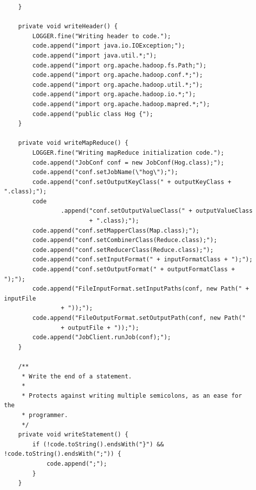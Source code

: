 \documentclass{report}
\begin{document}
\begin{verbatim}
	}

	private void writeHeader() {
		LOGGER.fine("Writing header to code.");
		code.append("import java.io.IOException;");
		code.append("import java.util.*;");
		code.append("import org.apache.hadoop.fs.Path;");
		code.append("import org.apache.hadoop.conf.*;");
		code.append("import org.apache.hadoop.util.*;");
		code.append("import org.apache.hadoop.io.*;");
		code.append("import org.apache.hadoop.mapred.*;");
		code.append("public class Hog {");
	}

	private void writeMapReduce() {
		LOGGER.fine("Writing mapReduce initialization code.");
		code.append("JobConf conf = new JobConf(Hog.class);");
		code.append("conf.setJobName(\"hog\");");
		code.append("conf.setOutputKeyClass(" + outputKeyClass + ".class);");
		code
				.append("conf.setOutputValueClass(" + outputValueClass
						+ ".class);");
		code.append("conf.setMapperClass(Map.class);");
		code.append("conf.setCombinerClass(Reduce.class);");
		code.append("conf.setReducerClass(Reduce.class);");
		code.append("conf.setInputFormat(" + inputFormatClass + ");");
		code.append("conf.setOutputFormat(" + outputFormatClass + ");");
		code.append("FileInputFormat.setInputPaths(conf, new Path(" + inputFile
				+ "));");
		code.append("FileOutputFormat.setOutputPath(conf, new Path("
				+ outputFile + "));");
		code.append("JobClient.runJob(conf);");
	}

	/**
	 * Write the end of a statement.
	 * 
	 * Protects against writing multiple semicolons, as an ease for the
	 * programmer.
	 */
	private void writeStatement() {
		if (!code.toString().endsWith("}") && !code.toString().endsWith(";")) {
			code.append(";");
		}
	}


\end{verbatim}
\end{document}
